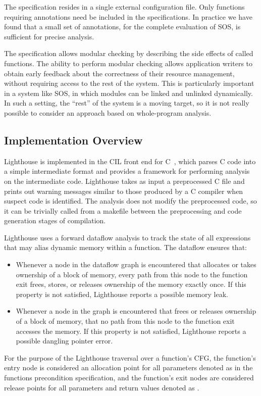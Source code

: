 The specification resides in a single external configuration file.
%
Only functions requiring annotations need be included in the specifications.
%
In practice we have found that a small set of annotations, \numannote for
the complete evaluation of SOS, is sufficient for precise analysis. 



The specification allows modular checking by describing the side effects of
called functions.
%
The ability to perform modular checking allows application writers to obtain
early feedback about the correctness of their resource management, without
requiring access to the rest of the system.  
%
This is particularly important in a system like SOS, in which modules can be
linked and unlinked dynamically.  
%
In such a setting, the ``rest'' of the system is a moving target, so it is not
really possible to consider an approach based on whole-program analysis.



\subsection{Implementation Overview}



Lighthouse is implemented in the CIL front end for C~\cite{CIL}, which
parses C code into a simple intermediate format and provides a framework for
performing analysis on the intermediate code. 
%
Lighthouse takes as input a preprocessed C file and prints out warning
messages similar to those produced by a C compiler when suspect code is
identified.
%
The analysis does not modify the preprocessed code, so it can be trivially
called from a makefile between the preprocessing and code generation stages
of compilation.



Lighthouse uses a forward dataflow analysis to track the state of all
expressions that may alias dynamic memory within a function.
%
The dataflow ensures that:
%
\begin{itemize}
%
\item Whenever a node in the dataflow graph is encountered that allocates or
takes ownership of a block of memory, every path from this node to the
function exit frees, stores, or releases ownership of the memory exactly
once.  
%
If this property is not satisfied, Lighthouse reports a possible memory
leak.
%
\item Whenever a node in the graph is encountered that frees or releases
ownership of a block of memory, that no path from this node to the function
exit accesses the memory.  
%
If this property is not satisfied, Lighthouse reports a possible dangling
pointer error.
%
\end{itemize}
%
For the purpose of the Lighthouse traversal over a function's CFG, the
function's entry node is considered an allocation point for all parameters
denoted as  in the functions precondition specification, and the
function's exit nodes are considered release points for all parameters and
return values denoted as .



